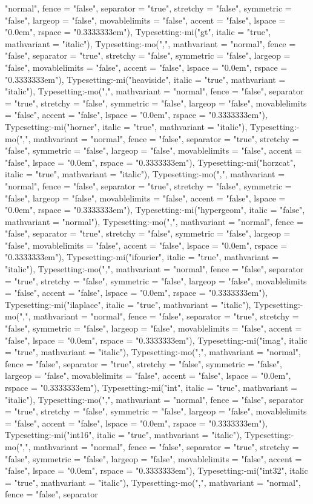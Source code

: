 \documentclass{article}
\begin{document}
{{{\begin{maplegroup}
\begin{maplelatex}
"normal", fence = "false", separator = "true", stretchy = "false", symmetric = "false", largeop = "false", movablelimits = "false", accent = "false", lspace = "0.0em", rspace = "0.3333333em"), Typesetting:-mi("gt", italic = "true", mathvariant = "italic"), Typesetting:-mo(",", mathvariant = "normal", fence = "false", separator = "true", stretchy = "false", symmetric = "false", largeop = "false", movablelimits = "false", accent = "false", lspace = "0.0em", rspace = "0.3333333em"), Typesetting:-mi("heaviside", italic = "true", mathvariant = "italic"), Typesetting:-mo(",", mathvariant = "normal", fence = "false", separator = "true", stretchy = "false", symmetric = "false", largeop = "false", movablelimits = "false", accent = "false", lspace = "0.0em", rspace = "0.3333333em"), Typesetting:-mi("horner", italic = "true", mathvariant = "italic"), Typesetting:-mo(",", mathvariant = "normal", fence = "false", separator = "true", stretchy = "false", symmetric = "false", largeop = "false", movablelimits = "false", accent = "false", lspace = "0.0em", rspace = "0.3333333em"), Typesetting:-mi("horzcat", italic = "true", mathvariant = "italic"), Typesetting:-mo(",", mathvariant = "normal", fence = "false", separator = "true", stretchy = "false", symmetric = "false", largeop = "false", movablelimits = "false", accent = "false", lspace = "0.0em", rspace = "0.3333333em"), Typesetting:-mi("hypergeom", italic = "false", mathvariant = "normal"), Typesetting:-mo(",", mathvariant = "normal", fence = "false", separator = "true", stretchy = "false", symmetric = "false", largeop = "false", movablelimits = "false", accent = "false", lspace = "0.0em", rspace = "0.3333333em"), Typesetting:-mi("ifourier", italic = "true", mathvariant = "italic"), Typesetting:-mo(",", mathvariant = "normal", fence = "false", separator = "true", stretchy = "false", symmetric = "false", largeop = "false", movablelimits = "false", accent = "false", lspace = "0.0em", rspace = "0.3333333em"), Typesetting:-mi("ilaplace", italic = "true", mathvariant = "italic"), Typesetting:-mo(",", mathvariant = "normal", fence = "false", separator = "true", stretchy = "false", symmetric = "false", largeop = "false", movablelimits = "false", accent = "false", lspace = "0.0em", rspace = "0.3333333em"), Typesetting:-mi("imag", italic = "true", mathvariant = "italic"), Typesetting:-mo(",", mathvariant = "normal", fence = "false", separator = "true", stretchy = "false", symmetric = "false", largeop = "false", movablelimits = "false", accent = "false", lspace = "0.0em", rspace = "0.3333333em"), Typesetting:-mi("int", italic = "true", mathvariant = "italic"), Typesetting:-mo(",", mathvariant = "normal", fence = "false", separator = "true", stretchy = "false", symmetric = "false", largeop = "false", movablelimits = "false", accent = "false", lspace = "0.0em", rspace = "0.3333333em"), Typesetting:-mi("int16", italic = "true", mathvariant = "italic"), Typesetting:-mo(",", mathvariant = "normal", fence = "false", separator = "true", stretchy = "false", symmetric = "false", largeop = "false", movablelimits = "false", accent = "false", lspace = "0.0em", rspace = "0.3333333em"), Typesetting:-mi("int32", italic = "true", mathvariant = "italic"), Typesetting:-mo(",", mathvariant = "normal", fence = "false", separator 
\end{maplelatex}
\end{maplegroup}}}}
\end{document}
